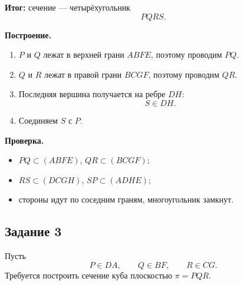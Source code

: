 \documentclass[a4paper,12pt]{article}
\newcommand{\Plane}{\ensuremath{\pi}}
\begin{document}
\begin{minipage}[t]{0.43\linewidth}
\textbf{Итог:} сечение --- четырёхугольник
\[
PQRS.
\]

\textbf{Построение.}
\begin{enumerate}
\item $P$ и $Q$ лежат в верхней грани $ABFE$, поэтому проводим $PQ$.
\item $Q$ и $R$ лежат в правой грани $BCGF$, поэтому проводим $QR$.
\item Последняя вершина получается на ребре $DH$:
\[
S\in DH.
\]
\item Соединяем $S$ с $P$.
\end{enumerate}

\textbf{Проверка.}
\begin{itemize}
\item $PQ\subset(ABFE)$, $QR\subset(BCGF)$;
\item $RS\subset(DCGH)$, $SP\subset(ADHE)$;
\item стороны идут по соседним граням, многоугольник замкнут.
\end{itemize}
\end{minipage}

\vspace{4mm}


\subsection*{Задание 3}

Пусть
\[
P\in DA,\qquad Q\in BF,\qquad R\in CG.
\]
Требуется построить сечение куба плоскостью $\Plane=PQR$.
\end{document}
